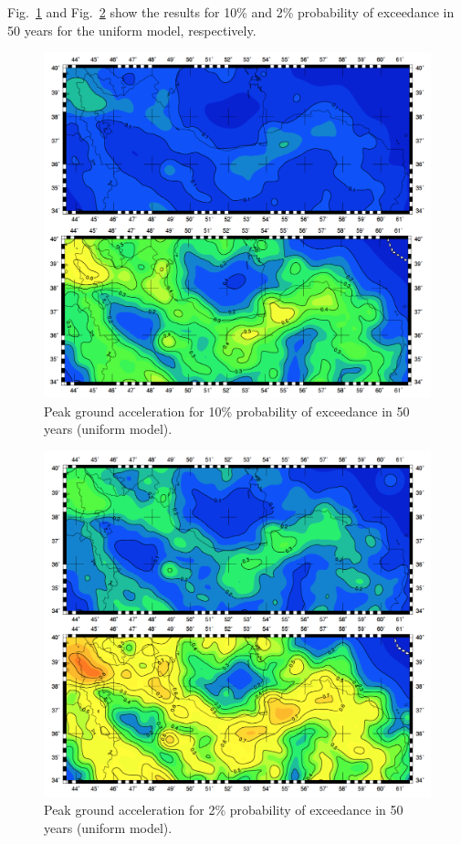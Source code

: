 Fig.~\ref{fig:pga_10_mean_uniform} and Fig.~\ref{fig:pga_2_mean_uniform} show the results for 10\% and 2\% probability of exceedance in 50 years for the uniform model, respectively.



\begin{figure} [!ht]
\centering
\includegraphics[scale=0.3]{figures/pdf/pga_10_mean_uniform.pdf} 
\caption{Peak ground acceleration for 10\% probability of exceedance in 50 years (uniform model).}
\label{fig:pga_10_mean_uniform}
\end{figure}

\begin{figure} [!ht]
\centering
\includegraphics[scale=0.3]{figures/pdf/pga_2_mean_uniform.pdf} 
\caption{Peak ground acceleration for 2\% probability of exceedance in 50 years (uniform model).}
\label{fig:pga_2_mean_uniform}
\end{figure}







